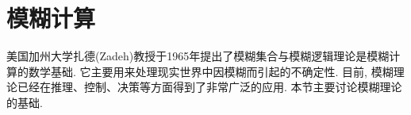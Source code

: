 \section{模糊计算}
美国加州大学扎德(Zadeh)教授于1965年提出了模糊集合与模糊逻辑理论是模糊计算的数学基础.
它主要用来处理现实世界中因模糊而引起的不确定性.
目前, 模糊理论已经在推理、控制、决策等方面得到了非常广泛的应用. 本节主要讨论模糊理论的基础.

